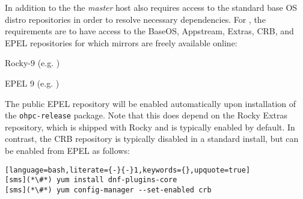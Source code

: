 In addition to the \OHPC{}
\iftoggle{isxCAT}{and \xCAT{} package repositories,}{package repository,}
the {\em master} host also requires access to the standard base OS distro
repositories in order to resolve necessary dependencies. For \baseOS{}, the
requirements are to have access to the BaseOS, Appstream, Extras, CRB,
and EPEL repositories for which mirrors are freely available online:

\begin{itemize*}
\item Rocky-9
  (e.g. \href{http://download.rockylinux.org/pub/rocky/9/}
             {\color{blue}{http://download.rockylinux.org/pub/rocky/9/}} )
\item EPEL 9 (e.g. \href{http://download.fedoraproject.org/pub/epel/9/}
                        {\color{blue}{http://download.fedoraproject.org/pub/epel/9/}} )
\end{itemize*}

\noindent The public EPEL repository will be enabled automatically upon
installation of the \texttt{ohpc-release} package. Note that this does depend
on the Rocky Extras repository, which is shipped with Rocky and is typically
enabled by default.  In contrast, the CRB repository is typically
disabled in a standard install, but can be enabled from EPEL as follows:

\begin{lstlisting}[language=bash,literate={-}{-}1,keywords={},upquote=true]
[sms](*\#*) yum install dnf-plugins-core
[sms](*\#*) yum config-manager --set-enabled crb
\end{lstlisting}
